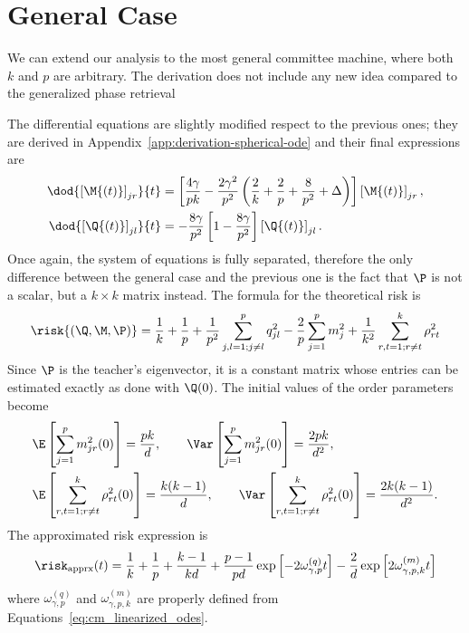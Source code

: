 \section{General Case}
We can extend our analysis to the most general committee machine, where both \(k\) and \(p\) are arbitrary.
The derivation does not include any new idea compared to the generalized phase retrieval

The differential equations are slightly modified respect to the previous ones;
they are derived in Appendix~\ref{app:derivation-spherical-ode} and their final expressions are
\begin{subequations}\label{eq:cm_linearized_odes}\begin{align}
  \dod{\left[\M{\left(t\right)}\right]_{jr}}{t}
    &= \left[
      \frac{4 \gamma}{pk} -\frac{2 \gamma^2}{p^2} \left(\frac2k +\frac{2}{p} + \frac{8}{p^2} + \Delta \right)
    \right] \left[\M{\left(t\right)}\right]_{jr},\\
  \dod{\left[\Q{\left(t\right)}\right]_{jl}}{t} &= -\frac{8 \gamma}{p^2} \left[1-\frac{8\gamma}{p^2}\right] \left[\Q{\left(t\right)}\right]_{jl}.
\end{align}\end{subequations}
Once again, the system of equations is fully separated, therefore the only difference between the general case and the previous one is 
the fact that \(\P\) is not a scalar, but a \(k\times k\) matrix instead. The formula for the theoretical risk is
\[
  \risk{(\Q,\M,\P)} = \frac1k + \frac1p + \frac{1}{p^2}\sum_{j,l=1;j\neq l}^p q^2_{jl} - \frac2p \sum_{j=1}^p m^2_{j} + \frac{1}{k^2}\sum_{r,t=1;r\neq t}^k \rho^2_{rt}
\]
Since \(\P\) is the teacher's eigenvector, it is a constant matrix whose entries can be estimated exactly as done with \(\Q(0)\). The initial values of the order parameters become
\[\begin{split}
  &\E\left[\sum_{j=1}^p m_{jr}^2{(0)}\right] = \frac{pk}{d}, \qquad
   \Var\left[\sum_{j=1}^p m_{jr}^2{(0)}\right] = \frac{2pk}{d^2}, \\
  &\E\left[\sum_{r,t=1;r\neq t}^k \rho_{rt}^2{(0)}\right] = \frac{k(k-1)}{d}, \qquad
   \Var\left[\sum_{r,t=1;r\neq t}^k \rho_{rt}^2{(0)}\right] = \frac{2k(k-1)}{d^2}. \\
 \end{split}\]
The approximated risk expression is 
\[
  \risk_\text{apprx}{(t)} = \frac1k + \frac1p + \frac{k-1}{kd} + \frac{p-1}{pd}\exp{\left[-2\omega^{(q)}_{\gamma,p} t\right]} - \frac2d \exp{\left[2\omega^{(m)}_{\gamma,p,k} t\right]}
\]
where \(\omega^{(q)}_{\gamma,p}\) and \(\omega^{(m)}_{\gamma,p,k}\) are properly defined from Equations~\eqref{eq:cm_linearized_odes}.

